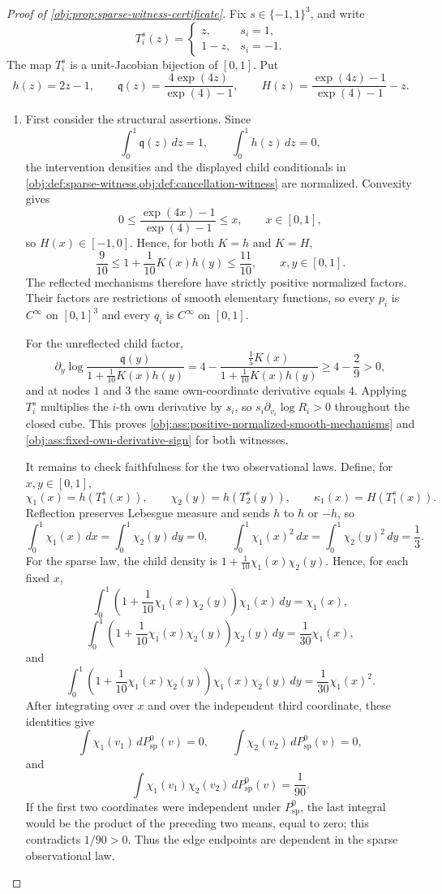 \begin{proof}[Proof of \cref{obj:prop:sparse-witness-certificate}]
Fix \(s\in\{-1,1\}^3\), and write
\[
T_i^s(z)=
\begin{cases}
z,& s_i=1,\\
1-z,& s_i=-1.
\end{cases}
\]
The map \(T_i^s\) is a unit-Jacobian bijection of \([0,1]\).  Put
\[
h(z)=2z-1,\qquad
\mathfrak q(z)=\frac{4\exp(4z)}{\exp(4)-1},
\qquad
H(z)=\frac{\exp(4z)-1}{\exp(4)-1}-z .
\]

\begin{enumerate}
\item First consider the structural assertions.  Since
\[
\int_0^1 \mathfrak q(z)\,dz=1,\qquad \int_0^1 h(z)\,dz=0,
\]
the intervention densities and the displayed child conditionals in \cref{obj:def:sparse-witness,obj:def:cancellation-witness} are normalized.  Convexity gives
\[
0\le \frac{\exp(4x)-1}{\exp(4)-1}\le x,\qquad x\in[0,1],
\]
so \(H(x)\in[-1,0]\).  Hence, for both \(K=h\) and \(K=H\),
\[
\frac9{10}\le 1+\frac1{10}K(x)h(y)\le \frac{11}{10},
\qquad x,y\in[0,1].
\]
The reflected mechanisms therefore have strictly positive normalized factors.  Their factors are restrictions of smooth elementary functions, so every \(p_i\) is \(C^\infty\) on \([0,1]^3\) and every \(q_i\) is \(C^\infty\) on \([0,1]\).

For the unreflected child factor,
\[
\partial_y\log\frac{\mathfrak q(y)}{1+\frac1{10}K(x)h(y)}
=
4-\frac{\frac15 K(x)}{1+\frac1{10}K(x)h(y)}
\ge 4-\frac29>0,
\]
and at nodes \(1\) and \(3\) the same own-coordinate derivative equals \(4\).  Applying \(T_i^s\) multiplies the \(i\)-th own derivative by \(s_i\), so \(s_i\partial_{v_i}\log R_i>0\) throughout the closed cube.  This proves \cref{obj:ass:positive-normalized-smooth-mechanisms} and \cref{obj:ass:fixed-own-derivative-sign} for both witnesses.

It remains to check faithfulness for the two observational laws.  Define, for \(x,y\in[0,1]\),
\[
\chi_1(x)=h(T_1^s(x)),\qquad
\chi_2(y)=h(T_2^s(y)),\qquad
\kappa_1(x)=H(T_1^s(x)).
\]
Reflection preserves Lebesgue measure and sends \(h\) to \(h\) or \(-h\), so
\[
\int_0^1\chi_1(x)\,dx=\int_0^1\chi_2(y)\,dy=0,
\qquad
\int_0^1\chi_1(x)^2\,dx=\int_0^1\chi_2(y)^2\,dy=\frac13.
\]
For the sparse law, the child density is \(1+\frac1{10}\chi_1(x)\chi_2(y)\).  Hence, for each fixed \(x\),
\[
\int_0^1\left(1+\frac1{10}\chi_1(x)\chi_2(y)\right)\chi_1(x)\,dy
=
\chi_1(x),
\]
\[
\int_0^1\left(1+\frac1{10}\chi_1(x)\chi_2(y)\right)\chi_2(y)\,dy
=
\frac1{30}\chi_1(x),
\]
and
\[
\int_0^1\left(1+\frac1{10}\chi_1(x)\chi_2(y)\right)\chi_1(x)\chi_2(y)\,dy
=
\frac1{30}\chi_1(x)^2.
\]
After integrating over \(x\) and over the independent third coordinate, these identities give
\[
\int \chi_1(v_1)\,dP^0_{\mathrm{sp}}(v)=0,
\qquad
\int \chi_2(v_2)\,dP^0_{\mathrm{sp}}(v)=0,
\]
and
\[
\int \chi_1(v_1)\chi_2(v_2)\,dP^0_{\mathrm{sp}}(v)=\frac1{90}.
\]
If the first two coordinates were independent under \(P^0_{\mathrm{sp}}\), the last integral would be the product of the preceding two means, equal to zero; this contradicts \(1/90>0\).  Thus the edge endpoints are dependent in the sparse observational law.


\end{enumerate}
\end{proof}
